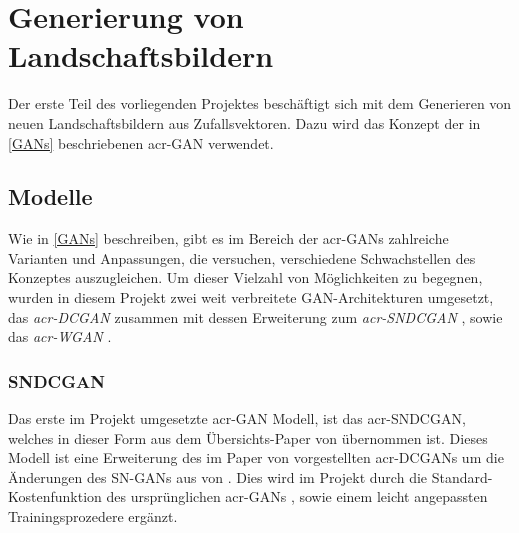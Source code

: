  \chapter{Generierung von Landschaftsbildern}\label{chp:bildgenerierung} %
 \glsresetall

 Der erste Teil des vorliegenden Projektes beschäftigt sich mit dem Generieren
 von neuen Landschaftsbildern aus Zufallsvektoren. Dazu wird das Konzept der in
 \cref{GANs} beschriebenen \gls{acr-GAN} verwendet.
 
 \section{Modelle}%

 Wie in \cref{GANs} beschreiben, gibt es im Bereich der \gls{acr-GAN}s
 zahlreiche Varianten und Anpassungen, die versuchen, verschiedene Schwachstellen
 des Konzeptes auszugleichen. Um dieser Vielzahl von Möglichkeiten zu begegnen,
 wurden in diesem Projekt zwei weit verbreitete \cite{kurach2018gan}
 GAN-Architekturen umgesetzt, das \emph{\gls{acr-DCGAN}}
 \cite{radford2015unsupervised} zusammen mit dessen Erweiterung zum
 \emph{\gls{acr-SNDCGAN}} \cite{miyato2018spectral}, sowie das
 \emph{\gls{acr-WGAN}} \cite{arjovsky2017wasserstein}. 

\subsection{SNDCGAN}\label{subsec:mod:sndc} %
\label{sub:sndcgan}

Das erste im Projekt umgesetzte \gls{acr-GAN} Modell, ist das \gls{acr-SNDCGAN},
welches
in dieser Form aus dem Übersichts-Paper
 von \citeauthor{kurach2018gan} \cite{kurach2018gan}
übernommen ist. Dieses Modell ist eine Erweiterung des im Paper
 von \citeauthor{radford2015unsupervised}
\cite{radford2015unsupervised} vorgestellten \gls{acr-DCGAN}s um die Änderungen
des SN-GANs aus  von
\citeauthor{miyato2018spectral} \cite{miyato2018spectral}. Dies wird im Projekt
durch die Standard-Kostenfunktion des ursprünglichen \gls{acr-GAN}s
\cite{goodfellow2014generative}, sowie einem leicht angepassten
Trainingsprozedere ergänzt.

